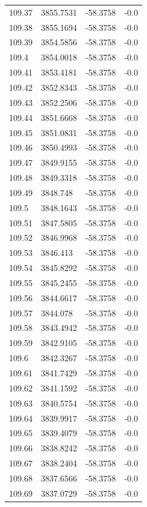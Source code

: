 \begin{table}[H]
\begin{tabular}{llll}
109.37 & 3855.7531 & -58.3758 & -0.0 \\
109.38 & 3855.1694 & -58.3758 & -0.0 \\
109.39 & 3854.5856 & -58.3758 & -0.0 \\
109.4 & 3854.0018 & -58.3758 & -0.0 \\
109.41 & 3853.4181 & -58.3758 & -0.0 \\
109.42 & 3852.8343 & -58.3758 & -0.0 \\
109.43 & 3852.2506 & -58.3758 & -0.0 \\
109.44 & 3851.6668 & -58.3758 & -0.0 \\
109.45 & 3851.0831 & -58.3758 & -0.0 \\
109.46 & 3850.4993 & -58.3758 & -0.0 \\
109.47 & 3849.9155 & -58.3758 & -0.0 \\
109.48 & 3849.3318 & -58.3758 & -0.0 \\
109.49 & 3848.748 & -58.3758 & -0.0 \\
109.5 & 3848.1643 & -58.3758 & -0.0 \\
109.51 & 3847.5805 & -58.3758 & -0.0 \\
109.52 & 3846.9968 & -58.3758 & -0.0 \\
109.53 & 3846.413 & -58.3758 & -0.0 \\
109.54 & 3845.8292 & -58.3758 & -0.0 \\
109.55 & 3845.2455 & -58.3758 & -0.0 \\
109.56 & 3844.6617 & -58.3758 & -0.0 \\
109.57 & 3844.078 & -58.3758 & -0.0 \\
109.58 & 3843.4942 & -58.3758 & -0.0 \\
109.59 & 3842.9105 & -58.3758 & -0.0 \\
109.6 & 3842.3267 & -58.3758 & -0.0 \\
109.61 & 3841.7429 & -58.3758 & -0.0 \\
109.62 & 3841.1592 & -58.3758 & -0.0 \\
109.63 & 3840.5754 & -58.3758 & -0.0 \\
109.64 & 3839.9917 & -58.3758 & -0.0 \\
109.65 & 3839.4079 & -58.3758 & -0.0 \\
109.66 & 3838.8242 & -58.3758 & -0.0 \\
109.67 & 3838.2404 & -58.3758 & -0.0 \\
109.68 & 3837.6566 & -58.3758 & -0.0 \\
109.69 & 3837.0729 & -58.3758 & -0.0 \\

\end{tabular}
\end{table}

